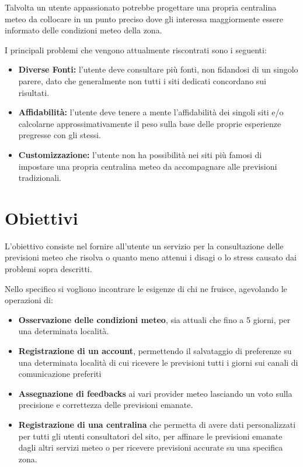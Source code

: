 \par Talvolta un utente appassionato potrebbe progettare una propria centralina meteo da collocare in un punto preciso dove gli interessa maggiormente essere informato delle condizioni meteo della zona.

\par I principali problemi che vengono attualmente riscontrati sono i seguenti:
\begin{itemize}
    \item \textbf{Diverse Fonti:} l'utente deve consultare più fonti, non fidandosi di un singolo parere, dato che generalmente non tutti i siti dedicati concordano sui risultati.
    \item \textbf{Affidabilità:} l'utente deve tenere a mente l'affidabilità dei singoli siti e/o calcolarne approssimativamente il peso sulla base delle proprie esperienze pregresse con gli stessi.
    \item \textbf{Customizzazione:} l'utente non ha possibilità nei siti più famosi di impostare una propria centralina meteo da accompagnare alle previsioni tradizionali.
\end{itemize}
 
\section{Obiettivi}
L'obiettivo consiste nel fornire all'utente un servizio per la consultazione delle previsioni meteo che risolva o quanto meno attenui i disagi o lo stress causato dai problemi sopra descritti. 

\par Nello specifico si vogliono incontrare le esigenze di chi ne fruisce, agevolando le operazioni di:
\begin{itemize}
    \item \textbf{Osservazione delle condizioni meteo}, sia attuali che fino a 5 giorni, per una determinata località.
    \item \textbf{Registrazione di un account}, permettendo il salvataggio di preferenze su una determinata località di cui ricevere le previsioni tutti i giorni sui canali di comunicazione preferiti
    \item \textbf{Assegnazione di feedbacks} ai vari provider meteo lasciando un voto sulla precisione e correttezza delle previsioni emanate. 
    \item \textbf{Registrazione di una centralina} che permetta di avere dati personalizzati per tutti gli utenti consultatori del sito, per affinare le previsioni emanate dagli altri servizi meteo o per ricevere previsioni accurate su una specifica zona.
\end{itemize}





